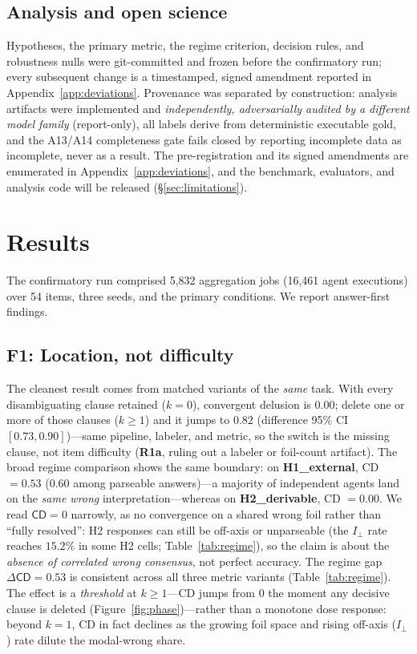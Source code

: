 \documentclass[acmsmall,screen,nonacm]{acmart}
\newcommand{\cd}{\textsf{CD}}
\newcommand{\iperp}{\ensuremath{I_\perp}}
\begin{document}
\subsection{Analysis and open science}
Hypotheses, the primary metric, the regime criterion, decision rules, and robustness nulls were
git-committed and frozen before the confirmatory run; every subsequent change is a timestamped, signed
amendment reported in Appendix~\ref{app:deviations}. Provenance was separated by construction: analysis
artifacts were implemented and \emph{independently, adversarially audited by a different model family}
(report-only), all labels derive from deterministic executable gold,
and the A13/A14 completeness gate fails closed by reporting incomplete data as incomplete, never as a result.
The pre-registration and its signed amendments are
enumerated in Appendix~\ref{app:deviations}, and the benchmark, evaluators, and analysis code will be
released (\S\ref{sec:limitations}).

\section{Results}
\label{sec:results}
The confirmatory run comprised 5{,}832 aggregation jobs (16{,}461 agent executions) over 54 items, three
seeds, and the primary conditions. We report answer-first findings.

\subsection{F1: Location, not difficulty}
The cleanest result comes from matched variants of the \emph{same} task. With every disambiguating clause
retained ($k{=}0$), convergent delusion is $0.00$; delete one or more of those clauses ($k{\ge}1$) and it
jumps to $0.82$ (difference 95\% CI $[0.73,0.90]$)---same pipeline, labeler, and metric, so the switch is the
missing clause, not item difficulty (\textbf{R1a}, ruling out a labeler or foil-count artifact). The broad
regime comparison shows the same boundary: on \textbf{H1\_external}, \cd{} $=0.53$ (0.60 among parseable
answers)---a majority of independent agents land on the \emph{same wrong} interpretation---whereas on
\textbf{H2\_derivable}, \cd{} $=0.00$. We read $\cd=0$ narrowly, as no convergence on a shared wrong foil
rather than ``fully resolved'': H2 responses can still be off-axis or unparseable (the \iperp{} rate reaches
$15.2\%$ in some H2 cells; Table~\ref{tab:regime}), so the claim is about the \emph{absence of correlated
wrong consensus}, not perfect accuracy. The regime gap $\Delta\cd=0.53$ is consistent across all three metric
variants (Table~\ref{tab:regime}). The effect is a \emph{threshold} at $k{\ge}1$---\cd{} jumps from $0$ the
moment any decisive clause is deleted (Figure~\ref{fig:phase})---rather than a monotone dose response:
beyond $k{=}1$, \cd{} in fact declines as the growing foil space and rising off-axis (\iperp{}) rate dilute
the modal-wrong share.
\end{document}
